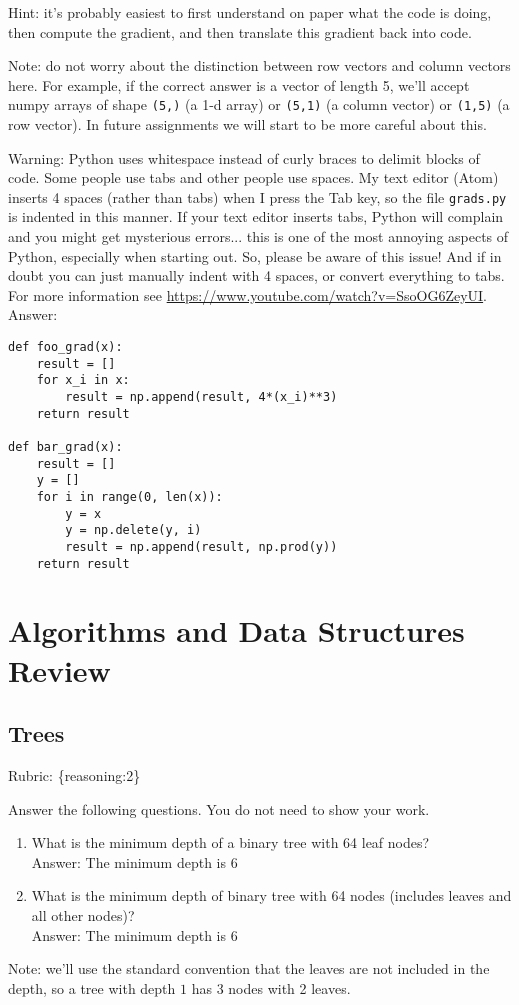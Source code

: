 \documentclass{article}
\def\rubric#1{\gre{Rubric: \{#1\}}}{}
\def\blu#1{{\color{blu}#1}}
\def\gre#1{{\color{gre}#1}}
\def\ans#1{\gre{Answer: #1}}{}
\begin{document}
Hint: it's probably easiest to first understand on paper what the code is doing, then compute
the gradient, and then translate this gradient back into code.

Note: do not worry about the distinction between row vectors and column vectors here.
For example, if the correct answer is a vector of length 5, we'll accept numpy arrays
of shape \texttt{(5,)} (a 1-d array) or \texttt{(5,1)} (a column vector) or
\texttt{(1,5)} (a row vector). In future assignments we will start to be more careful
about this.

Warning: Python uses whitespace instead of curly braces to delimit blocks of code.
Some people use tabs and other people use spaces. My text editor (Atom) inserts 4 spaces (rather than tabs) when
I press the Tab key, so the file \texttt{grads.py} is indented in this manner. If your text editor inserts tabs,
Python will complain and you might get mysterious errors... this is one of the most annoying aspects
of Python, especially when starting out. So, please be aware of this issue! And if in doubt you can just manually
indent with 4 spaces, or convert everything to tabs. For more information
see \url{https://www.youtube.com/watch?v=SsoOG6ZeyUI}. \\
\ans{}
\begin{Verbatim}
def foo_grad(x):
	result = []
	for x_i in x:
		result = np.append(result, 4*(x_i)**3)
	return result

def bar_grad(x):
	result = []
	y = []
	for i in range(0, len(x)):
		y = x
		y = np.delete(y, i)
		result = np.append(result, np.prod(y))
	return result
\end{Verbatim}




\section{Algorithms and Data Structures Review}

\subsection{Trees}
\rubric{reasoning:2}

\blu{Answer the following questions.} You do not need to show your work.

\begin{enumerate}
\item What is the minimum depth of a binary tree with 64 leaf nodes? \\
\ans{The minimum depth is $6$}
\item What is the minimum depth of binary tree with 64 nodes (includes leaves and all other nodes)? \\
\ans{The minimum depth is $6$}
\end{enumerate}
Note: we'll use the standard convention that the leaves are not included in the depth, so a tree with depth $1$ has 3 nodes with 2 leaves.
\end{document}
